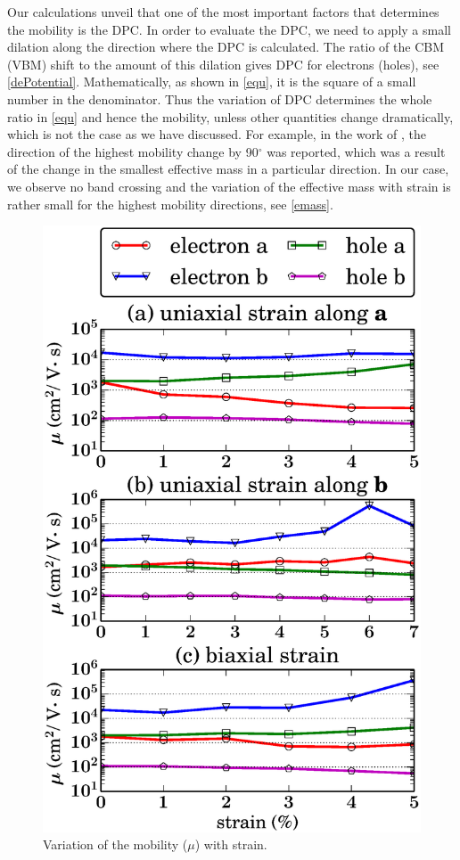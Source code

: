 Our calculations unveil that one of the most important  factors  that determines the mobility is the DPC.  In order to evaluate the DPC, we need to apply a small dilation  along the direction where the DPC is calculated. The ratio of the CBM (VBM) shift  to the amount of this dilation gives DPC for electrons (holes), see \autoref{dePotential}. Mathematically, as shown in \autoref{equ}, it is the square of a small number in the denominator. Thus the variation of DPC determines the whole ratio in \autoref{equ} and hence the mobility, unless other quantities change dramatically, which is not the case as we have discussed. For example, in the work of \citet{fei}, the direction of the highest mobility change by 90$^{\circ}$ was reported, which was a result of the change in the smallest effective mass in a particular direction. In our case, we  observe no band crossing  and the variation of the  effective mass with strain is rather small for the highest mobility directions, see \autoref{emass}.   

\begin{figure}[htb]
\centering
\includegraphics[width=0.6\linewidth]{Mob_mobility.eps}
\caption{Variation of the mobility ($\mu$) with strain.\label{mobility}}
\end{figure}

